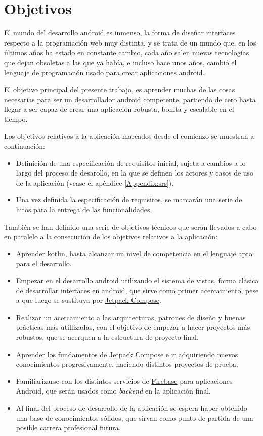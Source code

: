 \section{Objetivos}
El mundo del desarrollo android es inmenso, la forma de diseñar interfaces respecto a la programación web muy distinta, y se trata de un mundo que, en los últimos años ha estado en constante cambio, cada año salen nuevas tecnologías que dejan obsoletas a las que ya había, e incluso hace unos años, cambió el lenguaje de programación usado para crear aplicaciones android.

El objetivo principal del presente trabajo, es aprender muchas de las cosas necesarias para ser un desarrollador android competente, partiendo de cero hasta llegar a ser capaz de crear una aplicación robusta, bonita y escalable en el tiempo. 

Los objetivos relativos a la aplicación marcados desde el comienzo se muestran a continuación:
\begin{itemize}
	\item Definición de una especificación de requisitos inicial, sujeta a cambios a lo largo del proceso de desarollo, en la que se definen los actores y casos de uso de la aplicación (vease el apéndice \ref{Appendix:srs}).
	\item Una vez definida la especificación de requisitos, se marcarán una serie de hitos para la entrega de las funcionalidades.
\end{itemize}

También se han definido una serie de objetivos técnicos que serán llevados a cabo en paralelo a la consecución de los objetivos relativos a la aplicación:
\begin{itemize}
	\item Aprender kotlin, hasta alcanzar un nivel de competencia en el lenguaje apto para el desarrollo.
	\item Empezar en el desarrollo android utilizando el sistema de vistas, forma clásica de desarrollar interfaces en android, que sirve como primer acercamiento, pese a que luego se sustituya por \hyperlink{subsec:compose}{Jetpack Compose}. 
	\item Realizar un acercamiento a las arquitecturas, patrones de diseño y buenas prácticas más utillizadas, con el objetivo de empezar a hacer proyectos más robustos, que se acerquen a la estructura de proyecto final.
	\item Aprender los fundamentos de \hyperlink{subsec:compose}{Jetpack Compose} e ir adquiriendo nuevos conocimientos progresivamente, haciendo distintos proyectos de prueba.
	\item Familiarizarse con los distintos servicios de \hyperlink{subsec:firebase}{Firebase} para aplicaciones Android, que serán usados como \textit{backend} en la aplicación final.
	\item Al final del proceso de desarrollo de la aplicación se espera haber obtenido una base de conocimientos sólidos, que sirvan como punto de partida de una posible carrera profesional futura.
\end{itemize}

